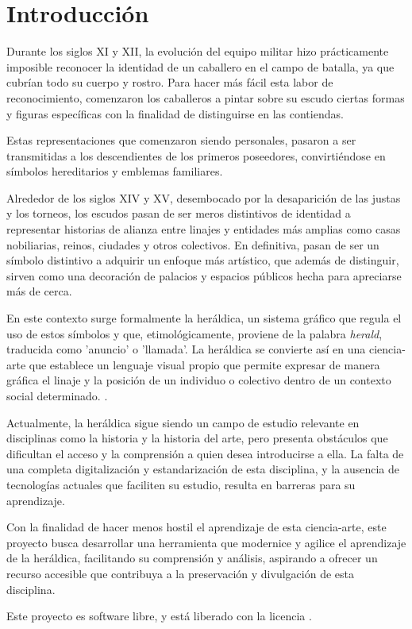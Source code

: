 \chapter{Introducción}

Durante los siglos XI y XII, la evolución del equipo militar hizo prácticamente
imposible reconocer la identidad de un caballero en el campo de batalla, ya que 
cubrían todo su cuerpo y rostro. Para hacer más fácil esta labor de
reconocimiento, comenzaron los caballeros a pintar sobre su escudo ciertas formas
y figuras específicas con la finalidad de distinguirse en las contiendas. 

Estas representaciones que comenzaron siendo personales, pasaron a ser transmitidas
a los descendientes de los primeros poseedores, convirtiéndose en símbolos
hereditarios y emblemas familiares. 

Alrededor de los siglos XIV y XV, desembocado por la desaparición de las justas y 
los torneos, los escudos pasan de ser meros distintivos de identidad a representar
historias de alianza entre linajes y entidades más amplias como casas nobiliarias,
reinos, ciudades y otros colectivos. En definitiva, pasan de ser un símbolo distintivo
a adquirir un enfoque más artístico, que además de distinguir, sirven como una decoración
de palacios y espacios públicos hecha para apreciarse más de cerca.

En este contexto surge formalmente la heráldica, un sistema gráfico que regula el uso 
de estos símbolos y que, etimológicamente, proviene de la palabra \textit{herald}, 
traducida como 'anuncio' o 'llamada'. La heráldica se convierte así en una ciencia-arte
que establece un lenguaje visual propio que permite expresar de manera gráfica el linaje
y la posición de un individuo o colectivo dentro de un contexto social determinado.
\cite{messia1990} \cite{delgado2019} \cite{pierrerer1858}.

Actualmente, la heráldica sigue siendo un campo de estudio relevante en disciplinas
como la historia y la historia del arte, pero presenta obstáculos que dificultan el 
acceso y la comprensión a quien desea introducirse a ella. La falta de una completa
digitalización y estandarización de esta disciplina, y la ausencia de tecnologías
actuales que faciliten su estudio, resulta en barreras para su aprendizaje.

Con la finalidad de hacer menos hostil el aprendizaje de esta ciencia-arte, este
proyecto busca desarrollar una herramienta que modernice y agilice el aprendizaje
de la heráldica, facilitando su comprensión y análisis, aspirando a ofrecer un 
recurso accesible que contribuya a la preservación y divulgación de esta disciplina.

Este proyecto es software libre, y está liberado con la licencia \cite{gplv3}.